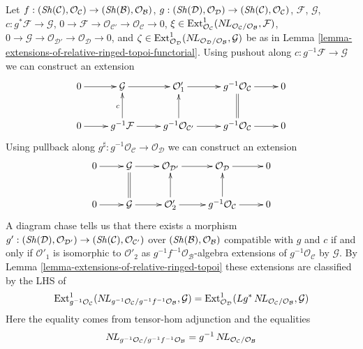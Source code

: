 \begin{remark}
\label{remark-extensions-of-relative-ringed-topoi-functorial}
Let $f : (\mathop{\mathit{Sh}}\nolimits(\mathcal{C}), \mathcal{O}_\mathcal{C}) \to
(\mathop{\mathit{Sh}}\nolimits(\mathcal{B}), \mathcal{O}_\mathcal{B})$,
$g : (\mathop{\mathit{Sh}}\nolimits(\mathcal{D}), \mathcal{O}_\mathcal{D}) \to
(\mathop{\mathit{Sh}}\nolimits(\mathcal{C}), \mathcal{O}_\mathcal{C})$,
$\mathcal{F}$,
$\mathcal{G}$,
$c : g^*\mathcal{F} \to \mathcal{G}$,
$0 \to \mathcal{F} \to \mathcal{O}_{\mathcal{C}'} \to
\mathcal{O}_\mathcal{C} \to 0$,
$\xi \in \mathop{\mathrm{Ext}}\nolimits^1_{\mathcal{O}_\mathcal{C}}(
\mathop{N\!L}\nolimits_{\mathcal{O}_\mathcal{C}/\mathcal{O}_\mathcal{B}}, \mathcal{F})$,
$0 \to \mathcal{G} \to \mathcal{O}_{\mathcal{D}'} \to
\mathcal{O}_\mathcal{D} \to 0$, and
$\zeta \in \mathop{\mathrm{Ext}}\nolimits^1_{\mathcal{O}_\mathcal{D}}(
\mathop{N\!L}\nolimits_{\mathcal{O}_\mathcal{D}/\mathcal{O}_\mathcal{B}}, \mathcal{G})$
be as in Lemma \ref{lemma-extensions-of-relative-ringed-topoi-functorial}.
Using pushout along $c : g^{-1}\mathcal{F} \to \mathcal{G}$
we can construct an extension
$$
\xymatrix{
0 \ar[r] &
\mathcal{G} \ar[r] &
\mathcal{O}'_1 \ar[r] &
g^{-1}\mathcal{O}_\mathcal{C} \ar[r] & 0 \\
0 \ar[r] &
g^{-1}\mathcal{F} \ar[u]^c \ar[r] &
g^{-1}\mathcal{O}_{\mathcal{C}'} \ar[u] \ar[r] &
g^{-1}\mathcal{O}_\mathcal{C} \ar@{=}[u] \ar[r] & 0
}
$$
Using pullback along
$g^\sharp : g^{-1}\mathcal{O}_\mathcal{C} \to \mathcal{O}_\mathcal{D}$
we can construct an extension
$$
\xymatrix{
0 \ar[r] &
\mathcal{G} \ar[r] &
\mathcal{O}_{\mathcal{D}'} \ar[r] &
\mathcal{O}_\mathcal{D} \ar[r] & 0 \\
0 \ar[r] &
\mathcal{G} \ar@{=}[u] \ar[r] &
\mathcal{O}'_2 \ar[u] \ar[r] &
g^{-1}\mathcal{O}_\mathcal{C} \ar[u] \ar[r] & 0
}
$$
A diagram chase tells us that there exists a morphism
$g' : (\mathop{\mathit{Sh}}\nolimits(\mathcal{D}), \mathcal{O}_{\mathcal{D}'}) \to
(\mathop{\mathit{Sh}}\nolimits(\mathcal{C}), \mathcal{O}_{\mathcal{C}'})$
over $(\mathop{\mathit{Sh}}\nolimits(\mathcal{B}), \mathcal{O}_\mathcal{B})$
compatible with $g$ and $c$ if and only if $\mathcal{O}'_1$ is isomorphic
to $\mathcal{O}'_2$ as $g^{-1}f^{-1}\mathcal{O}_\mathcal{B}$-algebra extensions
of $g^{-1}\mathcal{O}_\mathcal{C}$ by $\mathcal{G}$. By
Lemma \ref{lemma-extensions-of-relative-ringed-topoi}
these extensions are classified by the LHS of
$$
\mathop{\mathrm{Ext}}\nolimits^1_{g^{-1}\mathcal{O}_\mathcal{C}}(
\mathop{N\!L}\nolimits_{g^{-1}\mathcal{O}_\mathcal{C}/g^{-1}f^{-1}\mathcal{O}_\mathcal{B}},
\mathcal{G}) =
\mathop{\mathrm{Ext}}\nolimits^1_{\mathcal{O}_\mathcal{D}}(
Lg^*\mathop{N\!L}\nolimits_{\mathcal{O}_\mathcal{C}/\mathcal{O}_\mathcal{B}}, \mathcal{G})
$$
Here the equality comes from tensor-hom adjunction and
the equalities
$$
\mathop{N\!L}\nolimits_{g^{-1}\mathcal{O}_\mathcal{C}/g^{-1}f^{-1}\mathcal{O}_\mathcal{B}} =
g^{-1}\mathop{N\!L}\nolimits_{\mathcal{O}_\mathcal{C}/\mathcal{O}_\mathcal{B}}
$$
\end{remark}
